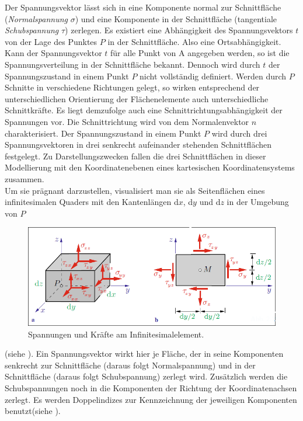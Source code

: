 \documentclass[12pt,a4paper,parskip,twoside,BCOR5mm,headsepline]{scrartcl}
\begin{document}
\begin{description*}
\begin{itemize*}
Der Spannungsvektor lässt sich in eine Komponente normal zur Schnittfläche (\emph{Normalspannung} $ \sigma $) und eine Komponente in der Schnittfläche (tangentiale \emph{Schubspannung} $ \tau $) zerlegen. Es existiert eine Abhängigkeit des Spannungsvektors $ t $ von der Lage des Punktes $ P $ in der Schnittfläche. Also eine Ortsabhängigkeit. Kann der Spannungsvektor $ t $ für alle Punkt von A angegeben werden, so ist die Spannungsverteilung in der Schnittfläche bekannt. Dennoch wird durch $ t $ der Spannungszustand in einem Punkt $ P $ nicht vollständig definiert. Werden durch $ P $ Schnitte in verschiedene Richtungen gelegt, so wirken entsprechend der unterschiedlichen Orientierung der Flächenelemente auch unterschiedliche Schnittkräfte. Es liegt demzufolge auch eine Schnittrichtungsabhängigkeit der Spannungen vor. Die Schnittrichtung wird von dem Normalenvektor $ n $ charakterisiert. Der Spannungszustand in einem Punkt $ P $ wird durch drei Spannungsvektoren in drei senkrecht aufeinander stehenden Schnittflächen festgelegt. Zu Darstellungszwecken fallen die drei Schnittflächen in dieser Modellierung mit den Koordinatenebenen eines kartesischen Koordinatensystems zusammen.\\
Um sie prägnant darzustellen, visualisiert man sie als Seitenflächen eines infinitesimalen Quaders mit den Kantenlängen d$ x $, d$ y $ und d$ z $ in der Umgebung von $ P $
\begin{figure}
  \centering
  \includegraphics[width=.8\textwidth]{tensor}
  \caption[Spannungen und Kräfte am Infinitesimalelement]{Spannungen und Kräfte am Infinitesimalelement.\\
   \autocite[44]{tmr}}
  \label{fig:tensor}
  \end{figure}
(siehe ). Ein Spannungsvektor wirkt hier je Fläche, der in seine Komponenten senkrecht zur Schnittfläche (daraus folgt Normalspannung) und in der Schnittfläche (daraus folgt Schubspannung) zerlegt wird. Zusätzlich werden die Schubspannungen noch in die Komponenten der Richtung der Koordinatenachsen zerlegt. Es werden Doppelindizes zur Kennzeichnung der jeweiligen Komponenten benutzt(siehe ). 

\end{itemize*}
\end{description*}
\end{document}

